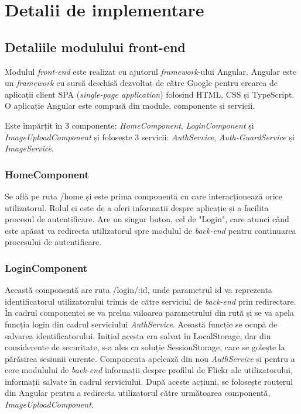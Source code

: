 \chapter{Detalii de implementare}
\section{Detaliile modulului front-end}
Modulul \textit{front-end} este realizat cu ajutorul \textit{framework}-ului Angular. Angular este un \textit{framework} cu sursă deschisă dezvoltat de către Google pentru crearea de aplicații client  SPA (\textit{single-page application}) folosind HTML, CSS și TypeScript. O aplicație Angular este compusă din module, componente și servicii.


Este împărțit în 3 componente: \textit{HomeComponent}, \textit{LoginComponent} și \textit{ImageUploadComponent} și folosește 3 servicii: \textit{AuthService}, \textit{Auth-GuardService} și \textit{ImageService}.

\subsection{HomeComponent}
 Se află pe ruta /home și este prima componentă cu care interacționează orice utilizatorul. Rolul ei este de a oferi informații despre aplicație și a facilita procesul de autentificare. Are un singur buton, cel de "Login", care atunci când este apăsat va redirecta utilizatorul spre modulul de \textit{back-end} pentru continuarea procesului de autentificare.
 
 \subsection{LoginComponent}
 Această componentă are ruta /login/:id, unde parametrul id va reprezenta identificatorul utilizatorului trimis de către serviciul de \textit{back-end} prin redirectare. În cadrul componentei se va prelua valoarea parametrului din rută și se va apela funcția login din cadrul serviciului \textit{AuthService}. Această funcție se ocupă de salvarea identificatorului. Inițial acesta era salvat în LocalStorage, dar din considerente de securitate, s-a ales ca soluție SessionStorage, care se golește la părăsirea sesiunii curente. Componenta apelează din nou \textit{AuthService} și pentru a cere modulului de \textit{back-end} informații despre profilul de Flickr ale utilizatorului, informații salvate în cadrul serviciului. După aceste acțiuni, se folosește routerul din Angular pentru a redirecta utilizatorul către următoarea componentă, \textit{ImageUploadComponent}.
 
